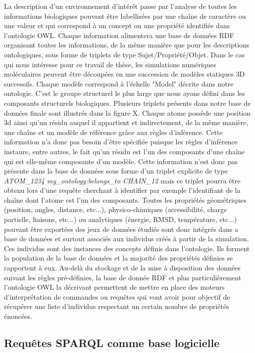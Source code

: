 La description d'un environnement d'intérêt passe par l'analyse de toutes les informations biologiques pouvant être labellisées par une chaîne de caractère ou une valeur et qui correspond à un concept ou une propriété identifiée dans l'ontologie OWL. Chaque information alimentera une base de données RDF organisant toutes les informations, de la même manière que pour les descriptions ontologiques, sous forme de triplets de type Sujet/Propriété/Objet.
Dans le cas qui nous intéresse pour ce travail de thèse, les simulations numériques moléculaires peuvent être découpées en une succession de modèles statiques 3D successifs. Chaque modèle correspond à l'échelle "Model" décrite dans notre ontologie. C'est le groupe structurel le plus large que nous ayons défini dans les composants structurels biologiques. Plusieurs triplets présents dans notre base de données finale sont illustrés dans la figure X. Chaque atome possède une position 3d ainsi qu'un résidu auquel il appartient et indirectement, de la même manière, une chaîne et un modèle de référence grâce aux règles d'inférence. Cette information n'a donc pas besoin d'être spécifiée puisque les règles d'inférence instaure, entre autres, le fait qu'un résidu est l'un des composants d'une chaîne qui est elle-même composante d'un modèle. Cette information n'est donc pas présente dans la base de données sous forme d'un triplet explicite de type \textit{ATOM\_1234 my\_ontology:belongs\_to CHAIN\_12} mais ce triplet pourra être obtenu lors d'une requête cherchant à identifier par exemple l'identifiant de la chaîne dont l'atome est l'un des composants. Toutes les propriétés géométriques (position, angles, distance, etc...), physico-chimiques (accessibilité, charge partielle, liaisons, etc...) ou analytiques (énergie, RMSD, température, etc...) pouvant être exportées des jeux de données étudiés sont donc intégrés dans a base de données et surtout associés aux individus créés à partir de la simulation. Ces individus sont des instances des concepts définis dans l'ontologie. Ils forment la population de la base de données et la majorité des propriétés définies se rapportent à eux.
Au-delà du stockage et de la mise à disposition des données suivant les règles pré-définies, la base de donnée RDF et plus particulièrement l'ontologie OWL la décrivant permettent de mettre en place des moteurs d'interprétation de commandes ou requêtes qui vont avoir pour objectif de récupérer une liste d'individus respectant un certain nombre de propriétés énoncées.

\subsection{Requêtes SPARQL comme base logicielle}

